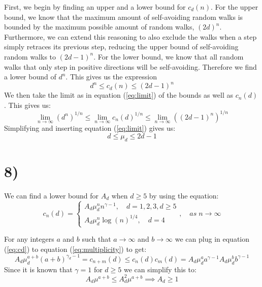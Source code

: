 \documentclass[a4paper]{article}
\begin{document}
First, we begin by finding an upper and a lower bound for $c_d(n)$. For the upper bound, we know that the maximum amount of self-avoiding random walks is bounded by the maximum possible amount of random walks, $(2d)^n$. Furthermore, we can extend this reasoning to also exclude the walks when a step simply retraces its previous step, reducing the upper bound of self-avoiding random walks to $(2d-1)^n$. For the lower bound, we know that all random walks that only step in positive directions will be self-avoiding. Therefore we find a lower bound of $d^n$. This gives us the expression \begin{equation}
    d^n \leq c_d(n) \leq (2d-1)^n
\end{equation}
We then take the limit as in equation (\ref{eq:limit}) of the bounds as well as $c_n(d)$. This gives us:
\begin{equation}
    \lim_{n \to \infty} (d^n)^{1/n} \leq \lim_{n \to \infty} c_n(d)^{1/n} \leq \lim_{n \to \infty} ((2d-1)^n)^{1/n}
\end{equation}
Simplifying and inserting equation (\ref{eq:limit}) gives us:
\begin{equation}
    d \leq \mu_d \leq 2d-1
\end{equation}

\section*{8)}
We can find a lower bound for $A_d$ when $d \geq 5$ by using the equation:
\begin{equation}
    \label{eq:cd}
    c_n(d) = 
    \begin{cases}
        A_d\mu_d^nn^{\gamma-1}, \quad d = 1, 2, 3, d \geq 5 \\
        A_d\mu_d^n\log(n)^{1/4}, \quad d = 4
    \end{cases}, \quad as \; n \to \infty
\end{equation}

For any integers $a$ and $b$ such that $a \to \infty$ and $b \to \infty$ we can plug in equation (\ref{eq:cd}) to equation (\ref{eq:multiplicity}) to get:
\begin{equation}
    A_d\mu_d^{a+b}(a+b)^{\gamma_d-1} = c_{n+m}(d)\leq c_n(d)c_m(d) = A_d\mu_d^aa^{\gamma-1}A_d\mu_d^bb^{\gamma-1}
\end{equation}
Since it is known that $\gamma = 1$ for $d \geq 5$ we can simplify this to:
\begin{equation}
    A_d\mu^{a+b} \leq A_d^2\mu^{a+b} \implies A_d \geq 1
\end{equation}
\end{document}
